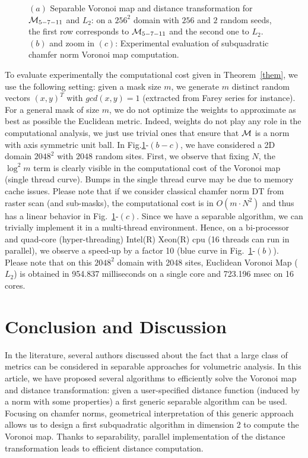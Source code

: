 \documentclass{llncs}
\begin{document}
\begin{figure}[htbp]
\begin{center}
\begin{tabular}{c}
    \end{tabular}
  \end{center}
  \caption{$(a)$ Separable Voronoi map and distance transformation for $\mathcal{M}_{5-7-11}$
    and $L_2$: on a $256^2$ domain with $256$ and $2$ random seeds,
    the first row corresponds to $\mathcal{M}_{5-7-11}$ and the second one to
    $L_2$. $(b)$ and zoom in $(c)$: Experimental evaluation of subquadratic chamfer norm
    Voronoi map computation.  \label{fig:2Dvoro}}
\end{figure}

To evaluate experimentally the computational cost given in
Theorem~\ref{them}, we use the following setting: given a mask size
$m$, we generate $m$ distinct random vectors $(x,y)^T$ with
$gcd(x,y)=1$ (extracted from Farey series for instance). For a general
mask of size $m$, we do not optimize the weights to approximate as
best as possible the Euclidean metric. Indeed, weights do not play any
role in the computational analysis, we just use trivial ones that
ensure that $\mathcal{M}$ is a norm with axis symmetric unit ball.  In
Fig.\ref{fig:2Dvoro}-$(b-c)$, we have considered a 2D domain $2048^2$
with $2048$ random sites. First, we observe that fixing $N$, the
$\log^2{m}$ term is clearly visible in the computational cost of the
Voronoi map (single thread curve). Bumps in the single thread curve
may be due to memory cache issues. Please note that if we consider
classical chamfer norm DT from raster scan (and sub-masks), the
computational cost is in $O(m\cdot N^2)$ and thus has a linear
behavior in Fig.~\ref{fig:2Dvoro}-$(c)$. Since we have a separable
algorithm, we can trivially implement it in a multi-thread
environment. Hence, on a bi-processor and quad-core (hyper-threading)
Intel(R) Xeon(R) cpu (16 threads can run in parallel), we observe a
speed-up by a factor 10 (blue curve in Fig.~\ref{fig:2Dvoro}-$(b)$).
Please note that on this $2048^2$ domain with 2048 sites, Euclidean
Voronoi Map ($L_2$) is obtained in 954.837 milliseconds on a single
core and 723.196 msec on 16 cores.

\section{Conclusion and Discussion}
\label{sec:discussion}

In the literature, several authors discussed about the fact that a
large class of metrics can be considered in separable approaches for
volumetric analysis. In this article, we have proposed several
algorithms to efficiently solve the Voronoi map and distance
transformation: given a user-specified distance function (induced by a
norm with some properties) a first generic separable algorithm can be
used. Focusing on chamfer norms, geometrical interpretation of this
generic approach allows us to design a first subquadratic algorithm in
dimension 2 to compute the Voronoi map. Thanks to separability,
parallel implementation of the distance transformation leads to
efficient distance computation.
\end{document}
